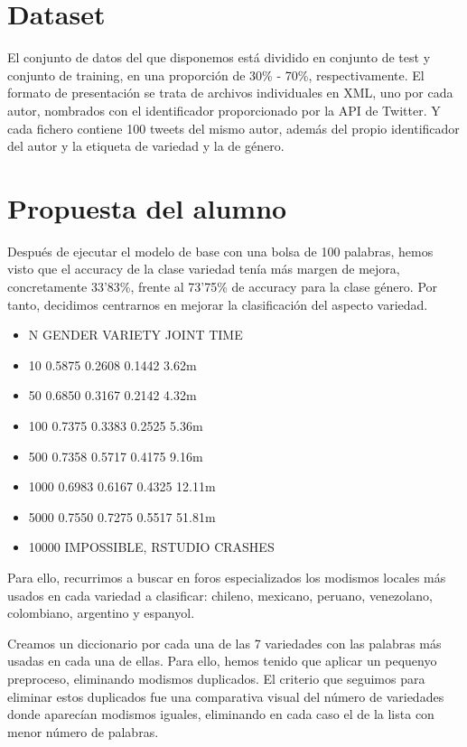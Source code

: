 \documentclass[11pt,a4paper]{article}
\begin{document}
\section{Dataset}

El conjunto de datos del que disponemos est\'a dividido en conjunto de test y conjunto de training, en una proporci\'on de 30\% - 70\%, respectivamente. El formato de presentaci\'on se trata de archivos individuales en XML, uno por cada autor, nombrados con el identificador proporcionado por la API de Twitter. Y cada fichero contiene 100 tweets del mismo autor, adem\'as del propio identificador del autor y la etiqueta de variedad y la de g\'enero. 


\section{Propuesta del alumno}

Despu\'es de ejecutar el modelo de base con una bolsa de 100 palabras, hemos visto que el accuracy de la clase variedad ten\'ia m\'as margen de mejora, concretamente 33'83\%, frente al 73'75\% de accuracy para la clase g\'enero. Por tanto, decidimos centrarnos en mejorar la clasificaci\'on del aspecto variedad. 

\begin{itemize}
    \item N GENDER VARIETY JOINT TIME 
    \item 10 0.5875 0.2608 0.1442 3.62m
    \item 50 0.6850 0.3167 0.2142 4.32m
    \item 100 0.7375 0.3383 0.2525 5.36m
    \item 500 0.7358 0.5717 0.4175 9.16m
    \item 1000 0.6983 0.6167 0.4325 12.11m
    \item 5000 0.7550 0.7275 0.5517 51.81m
    \item 10000 IMPOSSIBLE, RSTUDIO CRASHES
\end{itemize}
   


Para ello, recurrimos a buscar en foros especializados los modismos locales m\'as usados en cada variedad a clasificar: chileno, mexicano, peruano, venezolano, colombiano, argentino y espanyol. 

Creamos un diccionario por cada una de las 7 variedades con las palabras m\'as usadas en cada una de ellas. Para ello, hemos tenido que aplicar un pequenyo preproceso, eliminando modismos duplicados. El criterio que seguimos para eliminar estos duplicados fue una comparativa visual del n\'umero de variedades donde aparec\'ian modismos iguales, eliminando en cada caso el de la lista con menor n\'umero de palabras. 
\end{document}
